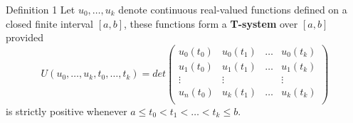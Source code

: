 \documentclass[12pt]{TD-CJS}
\begin{document}
\begin{theorem}{Definition 1}{}\label{deft}
    Let $u_0, \ldots, u_k$ denote continuous real-valued functions defined on a closed finite interval $[a,b]$, these functions form a \textbf{T-system} over $[a,b]$ provided  
\[U(u_0,\ldots,u_k, t_0,\ldots,t_k) = det\left ( \begin{array}{cccc}\label{eq: tdef2}
u_0(t_0) &u_0(t_1) &\ldots &u_0(t_k) \\
u_1(t_0) &u_1(t_1) &\ldots &u_1(t_k) \\
\vdots & \vdots &&\vdots\\
u_n(t_0) &u_k(t_1) &\ldots &u_k(t_k) \\
\end{array}\right)
    \] is strictly positive whenever $a\le t_0 <t_1< \ldots< t_k\le b$.
\end{theorem}
\end{document}
